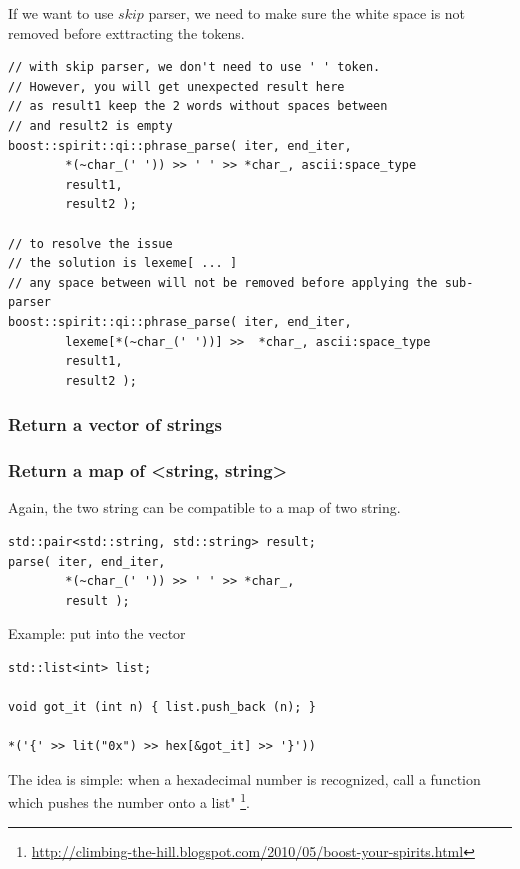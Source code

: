If we want to use $skip$ parser, we need to make sure the white space is not
removed before exttracting the tokens.
\begin{verbatim}
// with skip parser, we don't need to use ' ' token.
// However, you will get unexpected result here
// as result1 keep the 2 words without spaces between 
// and result2 is empty
boost::spirit::qi::phrase_parse( iter, end_iter,
		*(~char_(' ')) >> ' ' >> *char_, ascii:space_type
		result1,
		result2 );

// to resolve the issue
// the solution is lexeme[ ... ]
// any space between will not be removed before applying the sub-parser
boost::spirit::qi::phrase_parse( iter, end_iter,
		lexeme[*(~char_(' '))] >>  *char_, ascii:space_type
		result1,
		result2 );
\end{verbatim}

\subsubsection{Return a vector of strings}

\subsubsection{Return a map of <string, string>}

Again, the two string can be compatible to a map of two string. 
\begin{verbatim}
std::pair<std::string, std::string> result;
parse( iter, end_iter,
		*(~char_(' ')) >> ' ' >> *char_,
		result );
\end{verbatim}

Example: put into the vector
\begin{verbatim}
std::list<int> list;

void got_it (int n) { list.push_back (n); }

*('{' >> lit("0x") >> hex[&got_it] >> '}'))
\end{verbatim}
The idea is simple: when a hexadecimal number is recognized, call a function
which pushes the number onto a list"
\footnote{\url{http://climbing-the-hill.blogspot.com/2010/05/boost-your-spirits.html}}.

